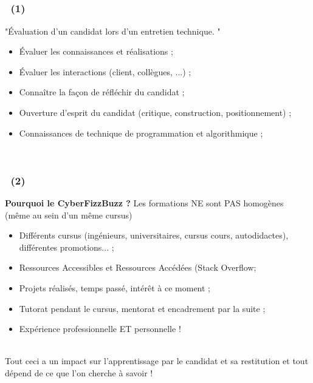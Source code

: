 \documentclass[slidetop,11pt]{beamer}
\begin{document}
\subsection{\titleTentativeDefinitionCyberFizzBuzz }
\begin{frame}
	\frametitle{\titleTentativeDefinitionCyberFizzBuzz ~(1)}
	
	"{\'E}valuation d'un candidat lors d'un entretien technique. "~\\
	
	\begin{itemize}
		\item {\'E}valuer les connaissances et r{\'e}alisations ; 
		\item {\'E}valuer les interactions (client, coll{\`e}gues, ...) ; 
		\item Conna{\^i}tre la fa\c{c}on de r{\'e}fl{\'e}chir du candidat ; 
		\item Ouverture d'esprit du candidat (critique, construction, positionnement) ; 
		\item Connaissances de technique de programmation et algorithmique ; 
	\end{itemize}~\\
	
\end{frame}

\begin{frame}
	\frametitle{\titleTentativeDefinitionCyberFizzBuzz ~(2)}
	
	\textbf{Pourquoi le CyberFizzBuzz ?} Les formations NE sont PAS homog{\`e}nes (m{\^e}me au sein d'un m{\^e}me cursus)~\\
	
	\begin{itemize}
		\item Diff{\'e}rents cursus (ing{\'e}nieurs, universitaires, cursus cours, autodidactes), diff{\'e}rentes promotions... ;  
		\item Ressources Accessibles et Ressources Acc{\'e}d{\'e}es (Stack Overflow; 
		\item Projets r{\'e}alis{\'e}s, temps pass{\'e}, int{\'e}r{\^e}t {\`a} ce moment ; 
		\item Tutorat pendant le cursus, mentorat et encadrement par la suite ; 
		\item Exp{\'e}rience professionnelle ET personnelle !
	\end{itemize}~\\
	
	Tout ceci a un impact sur l'apprentissage par le candidat et sa restitution et tout d{\'e}pend de ce que l'on cherche {\`a} savoir !
\end{frame}
\end{document}
